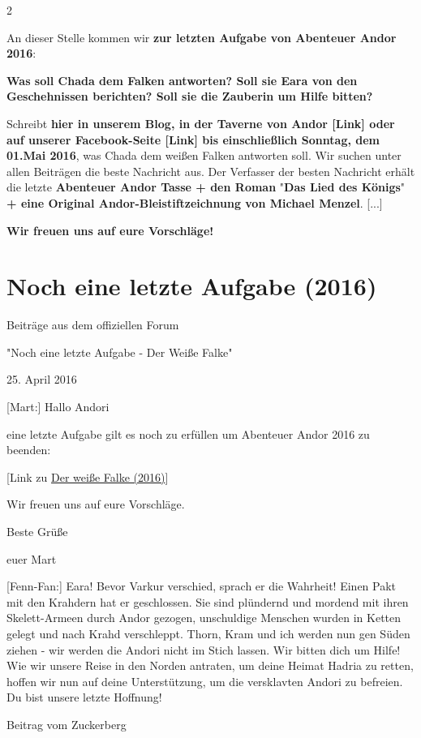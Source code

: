 \documentclass[10pt, a4paper, oneside]{book}
\newcommand{\storytext}[2][]{%
        \section{#2}%
        \label{storytext-#1}%
    }
\newcommand{\fillbreak}{\vspace*{\fill}\columnbreak}
\begin{document}
\begin{multicols}{2}
 

An dieser Stelle kommen wir \textbf{zur letzten Aufgabe von Abenteuer Andor 2016}:

\textbf{Was soll Chada dem Falken antworten? Soll sie Eara von den Geschehnissen berichten? Soll sie die Zauberin um Hilfe bitten?}


Schreibt\textbf{ hier in unserem Blog, in der Taverne von Andor [Link] oder auf unserer Facebook-Seite [Link] bis einschließlich Sonntag, dem 01.Mai 2016}, was Chada dem weißen Falken antworten soll. Wir suchen unter allen Beiträgen die beste Nachricht aus. Der Verfasser der besten Nachricht erhält die letzte \textbf{Abenteuer Andor Tasse + den Roman }"\textbf{Das Lied des Königs}"\textbf{ + eine Original Andor-Bleistiftzeichnung von Michael Menzel}. [...]

\textbf{Wir freuen uns auf eure Vorschläge!}




\fillbreak
\storytext[2016-noch-eine-letzte-aufgabe]{Noch eine letzte Aufgabe (2016)}

\begin{center}
    Beiträge aus dem offiziellen Forum

    "Noch eine letzte Aufgabe - Der Weiße Falke"

    25. April 2016
\end{center}



[Mart:] Hallo Andori

eine letzte Aufgabe gilt es noch zu erfüllen um Abenteuer Andor 2016 zu beenden:

[Link zu \hyperref[storytext-2016-der-weisse-falke]{Der weiße Falke (2016)}]

Wir freuen uns auf eure Vorschläge.

Beste Grüße

euer Mart

[Fenn-Fan:] Eara! Bevor Varkur verschied, sprach er die Wahrheit! Einen Pakt mit den Krahdern hat er geschlossen. Sie sind plündernd und mordend mit ihren Skelett-Armeen durch Andor gezogen, unschuldige Menschen wurden in Ketten gelegt und nach Krahd verschleppt. Thorn, Kram und ich werden nun gen Süden ziehen - wir werden die Andori nicht im Stich lassen. Wir bitten dich um Hilfe! Wie wir unsere Reise in den Norden antraten, um deine Heimat Hadria zu retten, hoffen wir nun auf deine Unterstützung, um die versklavten Andori zu befreien. Du bist unsere letzte Hoffnung!

\begin{center}
    Beitrag vom Zuckerberg


\end{center}
\end{multicols}
\end{document}
